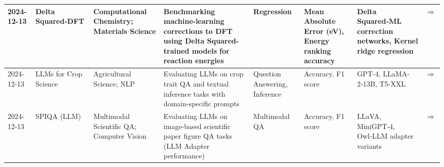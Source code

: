 \documentclass{article}
\begin{document}
\begin{landscape}
{\begin{longtable}{|p{1.5cm}|p{2.5cm}|p{2cm}|p{2cm}|p{3cm}|p{2cm}|p{2cm}|p{1cm}|}
2024-12-13 & Delta Squared‑DFT & Computational Chemistry; Materials Science & Benchmarking machine-learning corrections to DFT using Delta Squared-trained models for reaction energies & Regression & Mean Absolute Error (eV), Energy ranking accuracy & Delta Squared‑ML correction networks, Kernel ridge regression & \cite{liu2024delta2dft} \href{https://neurips.cc/virtual/2024/poster/97788}{$\Rightarrow$ } \\ \hline
2024-12-13 & LLMs for Crop Science & Agricultural Science; NLP & Evaluating LLMs on crop trait QA and textual inference tasks with domain-specific prompts & Question Answering, Inference & Accuracy, F1 score & GPT-4, LLaMA-2‑13B, T5‑XXL & \cite{patel2024llmcropsci} \href{https://neurips.cc/virtual/2024/poster/97570}{$\Rightarrow$ } \\ \hline
2024-12-13 & SPIQA (LLM) & Multimodal Scientific QA; Computer Vision & Evaluating LLMs on image-based scientific paper figure QA tasks (LLM Adapter performance) & Multimodal QA & Accuracy, F1 score & LLaVA, MiniGPT‑4, Owl‑LLM adapter variants & \cite{zhong2024spiqa_llm} \href{https://neurips.cc/virtual/2024/poster/97575}{$\Rightarrow$ } \\ \hline
\end{longtable}
}
\end{landscape}
\printbibliography
\end{document}
